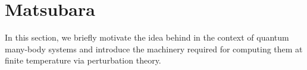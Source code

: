 \section{Matsubara \texorpdfstring{}{GF}}\label{chap:gf}
In this section, we briefly motivate the idea behind  in the context of quantum many-body systems and introduce the machinery required for computing them at finite temperature via perturbation theory.
